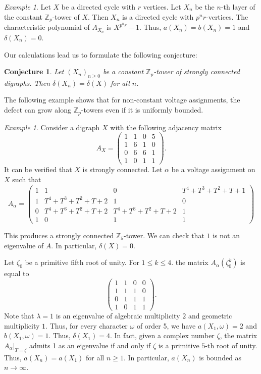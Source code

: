 \documentclass[11pt]{amsart}
\newtheorem{conjecture}[theorem]{Conjecture}
\numberwithin{equation}{section}
\theoremstyle{remark}
\newtheorem{example}[theorem]{Example}
\newcommand{\?}{\stackrel{?}{=}}
\newcommand{\Z}{\mathbb{Z}}
\begin{document}
\begin{example}
    Let $X$ be a directed cycle with $r$ vertices. Let $X_n$ be the $n$-th layer of the constant $\Z_p$-tower of $X$. Then $X_n$ is a directed cycle with $p^nr$-vertices. The characteristic polynomial of $A_{X_n}$ is $X^{p^nr}-1$. Thus, $a(X_n)=b(X_n)=1$ and $\delta(X_n)=0$.
\end{example}
Our calculations lead us to formulate the following conjecture: 
\begin{conjecture}\label{conj:constant}
    Let $(X_n)_{n\ge0}$ be a constant $\Z_p$-tower of strongly connected digraphs. Then $\delta(X_n)=\delta(X)$ for all $n$.
\end{conjecture}
The following example shows that for non-constant voltage assignments, the defect can grow along $\Z_p$-towers even if it is uniformly bounded.
\begin{example} Consider a digraph $X$ with the following adjacency matrix
\[A_X=\begin{pmatrix}
    1&1&0&5\\
    1&6&1&0\\
    0&6&6&1\\
    1&0&1&1
\end{pmatrix}.\] It can be verified that $X$ is  strongly connected. Let $\alpha$ be a voltage assignment on $X$ such that 
    \[
A_\alpha=
\begin{pmatrix}
1  & 1 & 0&T^4+T^3+T^2+T+1\\
1 &  T^4+T^3+T^2+T+2 & 1&0\\
0 &T^4+T^3+T^2+T+2 &  T^4+T^3+T^2+T+2&1\\
1&0&1&1
\end{pmatrix}
\]

This produces a strongly connected $\Z_5$-tower. We can check that $1$ is not an eigenvalue of $A$. In particular, $\delta(X)=0$. 

Let $\zeta_0$ be a primitive fifth root of unity. For $1\le k\le 4$. the matrix $A_\alpha(\zeta^k_0)$ is equal to
\[\begin{pmatrix}
    1&1&0&0\\
    1&1&1&0\\
    0&1&1&1\\
    1&0&1&1
    
\end{pmatrix}.\]
Note that $\lambda=1$ is an eigenvalue of algebraic multiplicity $2$ and geometric multiplicity $1$.  Thus, for every character $\omega$ of order 5, we have $a(X_1,\omega)=2$ and $b(X_1,\omega)=1$. Thus, $\delta(X_1)=4$. In fact, given a complex number $\zeta$, the matrix $A_\alpha|_{T=\zeta}$ admits 1 as an eigenvalue if and only if  $\zeta$ is a primitive $5$-th root of unity. Thus, $a(X_n)=a(X_1)$ for all $n\ge1$. In particular, $a(X_n)$ is bounded as $n\to\infty$. 
\end{example}
\end{document}
